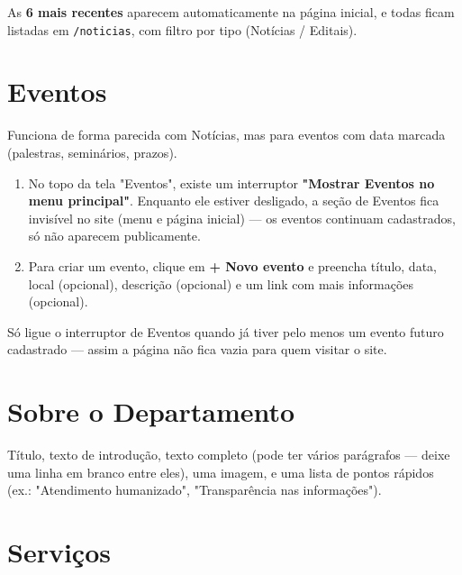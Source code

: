 \documentclass[11pt,a4paper]{article}
\begin{document}
As \textbf{6 mais recentes} aparecem automaticamente na página inicial, e todas ficam listadas
em \texttt{/noticias}, com filtro por tipo (Notícias / Editais).

\section{Eventos}

Funciona de forma parecida com Notícias, mas para eventos com data marcada (palestras,
seminários, prazos).

\begin{enumerate}[leftmargin=2em]
    \item No topo da tela "Eventos", existe um interruptor \textbf{"Mostrar Eventos no menu
          principal"}. Enquanto ele estiver desligado, a seção de Eventos fica invisível no
          site (menu e página inicial) — os eventos continuam cadastrados, só não aparecem
          publicamente.
    \item Para criar um evento, clique em \textbf{+ Novo evento} e preencha título, data, local
          (opcional), descrição (opcional) e um link com mais informações (opcional).
\end{enumerate}

\begin{dica}
Só ligue o interruptor de Eventos quando já tiver pelo menos um evento futuro cadastrado — assim
a página não fica vazia para quem visitar o site.
\end{dica}

\section{Sobre o Departamento}

Título, texto de introdução, texto completo (pode ter vários parágrafos — deixe uma linha em
branco entre eles), uma imagem, e uma lista de pontos rápidos (ex.: "Atendimento humanizado",
"Transparência nas informações").

\section{Serviços}
\end{document}
